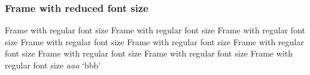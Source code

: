 \documentclass{beamer}
\newcommand\Fontvi{\fontsize{6}{7.2}\selectfont}
\newcommand{\add}[2]{\textit{#1} {`#2'}}
\newcommand\setfontsize[1]{\fontsize{#1}{44}\selectfont}
\begin{document}
\begin{frame}
\frametitle{Frame with reduced font size}
\Fontvi
\lipsum[1]
\end{frame}

\begin{frame}[t]{\setfontsize{6pt} Frame with regular font size Frame with regular font size Frame with regular font size Frame with regular font size Frame with regular font size Frame with regular font size Frame with regular font size Frame with regular font size Frame with regular font size}
\add{aaa}{bbb}

\lipsum[1]
\end{frame}
\end{document}
